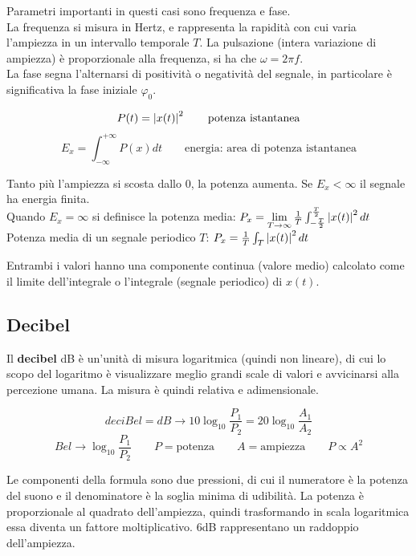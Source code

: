 Parametri importanti in questi casi sono frequenza e fase. \\
La frequenza si misura in Hertz, e rappresenta la rapidità con cui varia l'ampiezza in un intervallo temporale $T$. La pulsazione (intera variazione di ampiezza) è proporzionale alla frequenza, si ha che $\omega = 2\pi f$. \\
La fase segna l'alternarsi di positività o negatività del segnale, in particolare è significativa la fase iniziale $\varphi_0$.

$$P(t) = \left|x(t)\right|^2 \qquad \text{potenza istantanea}$$
$$E_x = \int_{-\infty}^{+\infty} P(x) dt \qquad \text{energia: area di potenza istantanea}$$

Tanto più l'ampiezza si scosta dallo 0, la potenza aumenta. Se $E_x < \infty$ il segnale ha energia finita. \\
Quando $E_x = \infty$ si definisce la potenza media: $P_x = \lim\limits_{T \rightarrow \infty} \frac{1}{T} \int_{-\frac{T}{2}}^{\frac{T}{2}} \left|x(t)\right|^2 dt$ \\
Potenza media di un segnale periodico $T$: $P_x = \frac{1}{T} \int_{T} \left|x(t)\right|^2 dt$

Entrambi i valori hanno una componente continua (valore medio) calcolato come il limite dell'integrale o l'integrale (segnale periodico) di $x(t)$.

\subsection{Decibel}
Il \textbf{decibel} dB è un'unità di misura logaritmica (quindi non lineare), di cui lo scopo del logaritmo è visualizzare meglio grandi scale di valori e avvicinarsi alla percezione umana. La misura è quindi relativa e adimensionale.

$$deciBel = dB \longrightarrow 10\log_{10} \frac{P_1}{P_2} = 20\log_{10} \frac{A_1}{A_2}$$
$$ Bel \longrightarrow \log_{10} \frac{P_1}{P_2} \qquad P = \text{potenza} \qquad A = \text{ampiezza} \qquad P \propto A^2$$

Le componenti della formula sono due pressioni, di cui il numeratore è la potenza del suono e il denominatore è la soglia minima di udibilità. La potenza è proporzionale al quadrato dell'ampiezza, quindi trasformando in scala logaritmica essa diventa un fattore moltiplicativo. 6dB rappresentano un raddoppio dell'ampiezza.

